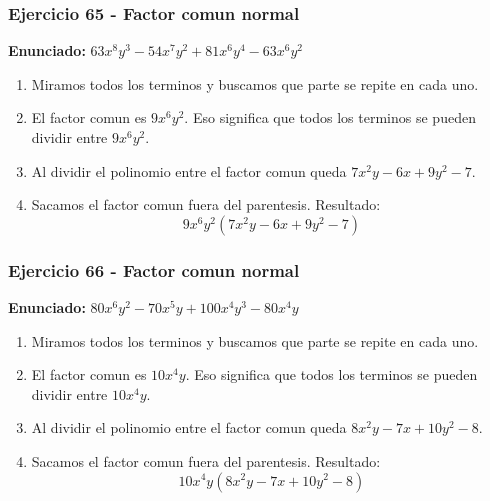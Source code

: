 \documentclass[11pt,a4paper]{article}
\begin{document}
\vspace{0.2cm}
\subsubsection*{Ejercicio 65 - Factor comun normal}
\textbf{Enunciado:} $ 63 x^{8} y^{3} - 54 x^{7} y^{2} + 81 x^{6} y^{4} - 63 x^{6} y^{2} $\par
\begin{enumerate}[leftmargin=2em]
\item Miramos todos los terminos y buscamos que parte se repite en cada uno.
\item El factor comun es \(9 x^{6} y^{2}\). Eso significa que todos los terminos se pueden dividir entre \(9 x^{6} y^{2}\).
\item Al dividir el polinomio entre el factor comun queda \(7 x^{2} y - 6 x + 9 y^{2} - 7\).
\item Sacamos el factor comun fuera del parentesis. Resultado: \[\boxed{9 x^{6} y^{2}\left(7 x^{2} y - 6 x + 9 y^{2} - 7\right)}\]
\end{enumerate}

\vspace{0.2cm}
\subsubsection*{Ejercicio 66 - Factor comun normal}
\textbf{Enunciado:} $ 80 x^{6} y^{2} - 70 x^{5} y + 100 x^{4} y^{3} - 80 x^{4} y $\par
\begin{enumerate}[leftmargin=2em]
\item Miramos todos los terminos y buscamos que parte se repite en cada uno.
\item El factor comun es \(10 x^{4} y\). Eso significa que todos los terminos se pueden dividir entre \(10 x^{4} y\).
\item Al dividir el polinomio entre el factor comun queda \(8 x^{2} y - 7 x + 10 y^{2} - 8\).
\item Sacamos el factor comun fuera del parentesis. Resultado: \[\boxed{10 x^{4} y\left(8 x^{2} y - 7 x + 10 y^{2} - 8\right)}\]
\end{enumerate}

\vspace{0.2cm}
\end{document}
